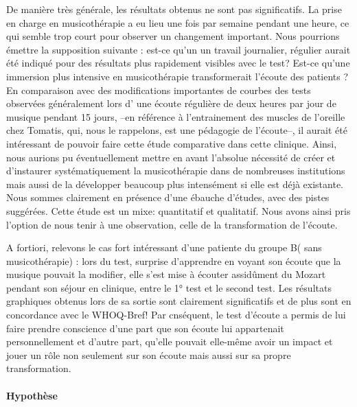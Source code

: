 \begin{enumerate}
  
  De manière très générale, les résultats obtenus ne
  sont pas significatifs.  La prise en charge en musicothérapie a eu lieu
  une fois par semaine pendant une heure, ce qui semble trop court pour observer un changement important. Nous pourrions émettre la supposition suivante :  est-ce qu'un un travail journalier, régulier aurait été indiqué pour des résultats plus rapidement visibles avec le test?
  Est-ce qu'une immersion plus intensive en musicothérapie transformerait l'écoute des patients ? 
   En comparaison avec des
  modifications importantes de courbes des tests observées généralement  lors d' une écoute
  régulière de deux heures par jour de musique pendant 15 jours, --en référence à l'entrainement des muscles de l'oreille chez Tomatis, qui, nous le rappelons, est une pédagogie de l'écoute--, il aurait été intéressant de pouvoir faire cette étude comparative dans cette clinique. Ainsi, nous aurions pu éventuellement mettre en avant  l'absolue nécessité de créer et d'instaurer systématiquement la musicothérapie dans de nombreuses institutions mais aussi  de la développer beaucoup plus intensément  si elle est déjà existante.
  Nous sommes clairement en présence d'une ébauche d'études, avec des pistes
  suggérées. 
  Cette étude est un mixe: quantitatif et qualitatif. Nous avons ainsi pris l'option de nous tenir à une
  observation, celle de la transformation de l'écoute.
  
  A fortiori, relevons le cas fort intéressant  d'une patiente du groupe B( sans
  musicothérapie) : lors du test, surprise d'apprendre en voyant son écoute que la musique pouvait la modifier, elle s'est mise à écouter assidûment du Mozart pendant son séjour en clinique, entre le 1° test et le second test.  Les résultats
  graphiques obtenus lors de sa sortie sont clairement significatifs
  et de plus sont en concordance avec le WHOQ-Bref!  
  Par cnséquent, le test d'écoute a permis de lui faire prendre conscience d'une part que son écoute lui appartenait personnellement et d'autre part, qu'elle pouvait elle-même avoir un impact et jouer un rôle non seulement sur son écoute mais aussi sur sa propre  transformation.



   
   
   
   
  \end{enumerate}







\paragraph{Hypothèse}

